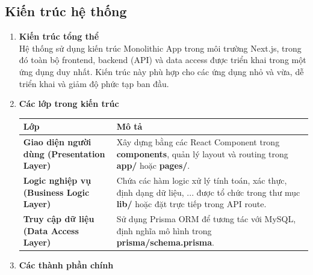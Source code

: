 \documentclass[a4paper]{article}
\begin{document}
\subsection{Kiến trúc hệ thống}
\begin{enumerate}[label=\textbf{\alph*.}]
    \item \textbf{Kiến trúc tổng thể} \\
          \sloppy Hệ thống sử dụng kiến trúc Monolithic App trong môi trường Next.js, trong đó toàn bộ frontend, backend (API) và data access được triển khai trong một ứng dụng duy nhất. Kiến trúc này phù hợp cho các ứng dụng nhỏ và vừa, dễ triển khai và giảm độ phức tạp ban đầu.
    \item \textbf{Các lớp trong kiến trúc}
          \begin{table}[H]
              \small
              \centering
              \renewcommand{\arraystretch}{1.5} %
                \setlength{\arrayrulewidth}{0.5mm} %
                 \setlength{\tabcolsep}{5pt} %
              \begin{tabularx}{\textwidth}{|>{\raggedright\arraybackslash}p{5cm}|X|}
                  \hline
                  \textbf{Lớp}                                       & \textbf{Mô tả}                                                                                                                                    \\
                  \hline
                  \textbf{Giao diện người dùng (Presentation Layer)} & Xây dựng bằng các React Component trong \textbf{components}, quản lý layout và routing trong \textbf{app/} hoặc \textbf{pages/}.                  \\
                  \hline
                  \textbf{Logic nghiệp vụ (Business Logic Layer)}    & Chứa các hàm logic xử lý tính toán, xác thực, định dạng dữ liệu, ... được tổ chức trong thư mục \textbf{lib/} hoặc đặt trực tiếp trong API route. \\
                  \hline
                  \textbf{Truy cập dữ liệu (Data Access Layer)}      & Sử dụng Prisma ORM để tương tác với MySQL, định nghĩa mô hình trong \textbf{prisma/schema.prisma}.                                                \\
                  \hline
              \end{tabularx}
          \end{table}
    \item  \textbf{Các thành phần chính}

\end{enumerate}
\end{document}
